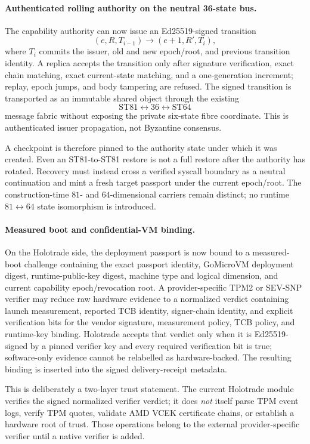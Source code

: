 \paragraph{Authenticated rolling authority on the neutral 36-state bus.}
The capability authority can now issue an Ed25519-signed transition
\[
  (e,R,T_{i-1})\longrightarrow(e+1,R',T_i),
\]
where $T_i$ commits the issuer, old and new epoch/root, and previous transition identity.  A replica accepts the transition only after signature verification, exact chain matching, exact current-state matching, and a one-generation increment; replay, epoch jumps, and body tampering are refused.  The signed transition is transported as an immutable shared object through the existing
\[
  \mathrm{ST81}\leftrightarrow 36\leftrightarrow\mathrm{ST64}
\]
message fabric without exposing the private six-state fibre coordinate.  This is authenticated issuer propagation, not Byzantine consensus.

A checkpoint is therefore pinned to the authority state under which it was created.  Even an ST81-to-ST81 restore is not a full restore after the authority has rotated.  Recovery must instead cross a verified syscall boundary as a neutral continuation and mint a fresh target passport under the current epoch/root.  The construction-time $81$- and $64$-dimensional carriers remain distinct; no runtime $81\leftrightarrow64$ state isomorphism is introduced.

\paragraph{Measured boot and confidential-VM binding.}
On the Holotrade side, the deployment passport is now bound to a measured-boot challenge containing the exact passport identity, GoMicroVM deployment digest, runtime-public-key digest, machine type and logical dimension, and current capability epoch/revocation root.  A provider-specific TPM2 or SEV-SNP verifier may reduce raw hardware evidence to a normalized verdict containing launch measurement, reported TCB identity, signer-chain identity, and explicit verification bits for the vendor signature, measurement policy, TCB policy, and runtime-key binding.  Holotrade accepts that verdict only when it is Ed25519-signed by a pinned verifier key and every required verification bit is true; software-only evidence cannot be relabelled as hardware-backed.  The resulting binding is inserted into the signed delivery-receipt metadata.

This is deliberately a two-layer trust statement.  The current Holotrade module verifies the signed normalized verifier verdict; it does \emph{not} itself parse TPM event logs, verify TPM quotes, validate AMD VCEK certificate chains, or establish a hardware root of trust.  Those operations belong to the external provider-specific verifier until a native verifier is added.

